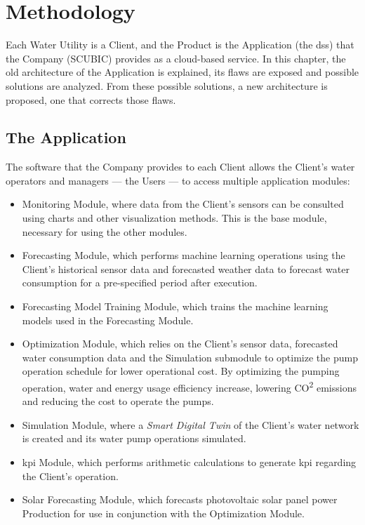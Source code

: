 \chapter{Methodology}\label{methodology}


Each Water Utility is a Client, and the Product is the Application (the \gls{dss}) that the Company (SCUBIC) provides as a cloud-based service. In this chapter, the old architecture of the Application is explained, its flaws are exposed and possible solutions are analyzed. From these possible solutions, a new architecture is proposed, one that corrects those flaws.

\section{The Application}\label{methodology:s:the-aplication}

The software that the Company provides to each Client allows the Client's water operators and managers --- the Users --- to access multiple application modules:

\begin{itemize}
    \item Monitoring Module, where data from the Client's sensors can be consulted using charts and other visualization methods. This is the base module, necessary for using the other modules.
    \item Forecasting Module, which performs machine learning operations using the Client's historical sensor data and forecasted weather data to forecast water consumption for a pre-specified period after execution.
    \item Forecasting Model Training Module, which trains the machine learning models used in the Forecasting Module.
    \item Optimization Module, which relies on the Client's sensor data, forecasted water consumption data and the Simulation submodule to optimize the pump operation schedule for lower operational cost. By optimizing the pumping operation, water and energy usage efficiency increase, lowering CO\textsuperscript{2} emissions and reducing the cost to operate the pumps.
    \item Simulation Module, where a \textit{Smart Digital Twin} of the Client's water network is created and its water pump operations simulated.
    \item \gls{kpi} Module, which performs arithmetic calculations to generate \gls{kpi} regarding the Client's operation.
    \item Solar Forecasting Module, which forecasts photovoltaic solar panel power Production for use in conjunction with the Optimization Module.
\end{itemize}  
    
